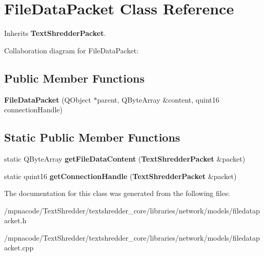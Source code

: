 \section{FileDataPacket Class Reference}
\label{class_file_data_packet}


Inherits {\bf TextShredderPacket}.



Collaboration diagram for FileDataPacket:
\subsection*{Public Member Functions}
\begin{DoxyCompactItemize}
\item 
{\bfseries FileDataPacket} (QObject $\ast$parent, QByteArray \&content, quint16 connectionHandle)\label{class_file_data_packet_af12461d6909db84d94cb2121d35d50e2}

\end{DoxyCompactItemize}
\subsection*{Static Public Member Functions}
\begin{DoxyCompactItemize}
\item 
static QByteArray {\bfseries getFileDataContent} ({\bf TextShredderPacket} \&packet)\label{class_file_data_packet_a3c2ff0442d42f365a25fe10c63d362aa}

\item 
static quint16 {\bfseries getConnectionHandle} ({\bf TextShredderPacket} \&packet)\label{class_file_data_packet_a7b0a80af65a8be68961bc61eeb3e40f2}

\end{DoxyCompactItemize}


The documentation for this class was generated from the following files:\begin{DoxyCompactItemize}
\item 
/mpnacode/TextShredder/textshredder\_\-core/libraries/network/models/filedatapacket.h\item 
/mpnacode/TextShredder/textshredder\_\-core/libraries/network/models/filedatapacket.cpp\end{DoxyCompactItemize}
